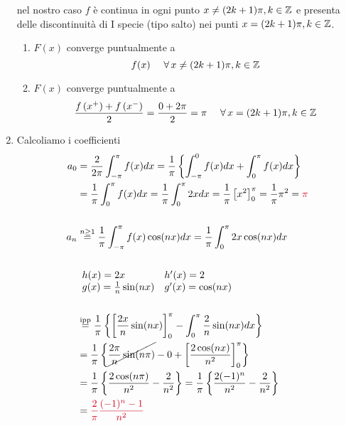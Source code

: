 \begin{enumerate}
nel nostro caso $f$ è continua in ogni punto $x\neq (2k + 1) \pi ,k\in \mathbb{Z} $ e presenta delle discontinuità di I specie (tipo salto) nei punti $x = (2k + 1) \pi ,k\in \mathbb{Z} $.
\begin{enumerate}
\item $F(x)$ converge puntualmente a\begin{equation*}
f(x) \ \ \ \ \forall x\neq (2k + 1) \pi ,k\in \ZZ 
\end{equation*}
\item $F(x)$ converge puntualmente a\begin{equation*}
\frac{f\left(x^{ + }\right) + f\left(x^{ - }\right)}{2} = \frac{0 + 2\pi }{2} = \pi \ \ \ \ \forall x = (2k + 1) \pi ,k\in \ZZ 
\end{equation*}
\end{enumerate}
\item Calcoliamo i coefficienti\begin{align*}
a_{0} & = \frac{2}{2\pi }\int ^{\pi }_{ - \pi } f(x) dx = \frac{1}{\pi }\left\{\int ^{0}_{ - \pi } f(x) dx + \int ^{\pi }_{0} f(x) dx\right\}\\
 & = \frac{1}{\pi }\int ^{\pi }_{0} f(x) dx = \frac{1}{\pi }\int ^{\pi }_{0} 2xdx = \frac{1}{\pi }\left[ x^{2}\right]^{\pi }_{0} = \frac{1}{\pi } \pi ^{2} = \textcolor[rgb]{0.82,0.01,0.11}{\pi }\\
 & \\
a_{n} & \overset{n\geq 1}{ = }\frac{1}{\pi }\int ^{\pi }_{ - \pi } f(x)\cos(nx) dx = \frac{1}{\pi }\int ^{\pi }_{0} 2x\cos(nx) dx\\
 & \\
 & \begin{array}{ l l }
h(x) = 2x & h'(x) = 2\\
g(x) = \frac{1}{n}\sin(nx) & g'(x) = \cos(nx)
\end{array}\\
 & \\
 & \overset{\text{ipp}}{ = }\frac{1}{\pi }\left\{\left[\frac{2x}{n}\sin(nx)\right]^{\pi }_{0} - \int ^{\pi }_{0}\frac{2}{n}\sin(nx) dx\right\}\\
 & = \frac{1}{\pi }\left\{\cancel{\frac{2\pi }{n}\sin(n\pi)} - 0 + \left[\frac{2\cos(nx)}{n^{2}}\right]^{\pi }_{0}\right\}\\
 & = \frac{1}{\pi }\left\{\frac{2\cos(n\pi)}{n^{2}} - \frac{2}{n^{2}}\right\} = \frac{1}{\pi }\left\{\frac{2(- 1)^{n}}{n^{2}} - \frac{2}{n^{2}}\right\}\\
 & = \textcolor[rgb]{0.82,0.01,0.11}{\frac{2}{\pi }}\textcolor[rgb]{0.82,0.01,0.11}{\frac{(- 1)^{n} - 1}{n^{2}}}\\

\end{align*}
\end{enumerate}
